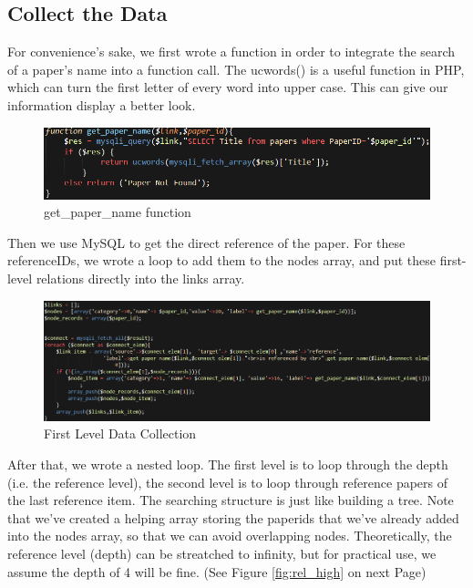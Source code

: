 \documentclass{book}
\begin{document}
\subsection{Collect the Data}

For convenience's sake, we first wrote a function in order to integrate the search of a paper's name into a function call. The ucwords() is a useful function in PHP, which can turn the first letter of every word into upper case. This can give our information display a better look.

\begin{figure}[htp]
\centering
\includegraphics[scale=0.55]{img/zlt_rel_code_func.png}
\caption{get\_paper\_name function}
\end{figure}

Then we use MySQL to get the direct reference of the paper. For these referenceIDs, we wrote a loop to add them to the nodes array, and put these first-level relations directly into the links array.

\begin{figure}[htp]
\centering
\includegraphics[scale=0.55]{img/zlt_rel_code_lev1.png}
\caption{First Level Data Collection}
\end{figure}

After that, we wrote a nested loop. The first level is to loop through the depth (i.e. the reference level), the second level is to loop through reference papers of the last reference item. The searching structure is just like building a tree. Note that we've created a helping array storing the paperids that we've already added into the nodes array, so that we can avoid overlapping nodes. Theoretically, the reference level (depth) can be streatched to infinity, but for practical use, we assume the depth of 4 will be fine. (See Figure \ref{fig:rel_high} on next Page)
\end{document}
